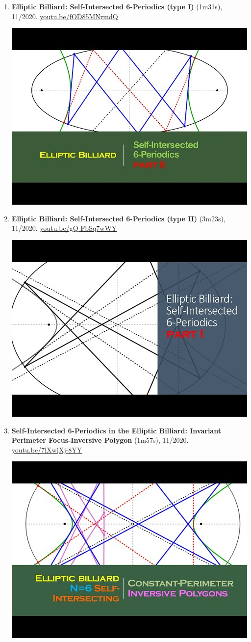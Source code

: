 \documentclass[12pt]{article}
\begin{document}
\begin{enumerate}[resume]
% 
\item \textbf{Elliptic Billiard: Self-Intersected 6-Periodics (type I)} (1m31s), 11/2020. \href{https://youtu.be/fOD85MNrmdQ}{\url{youtu.be/fOD85MNrmdQ}}
\begin{center}\includegraphics[width=.5\textwidth]{pics/fOD85MNrmdQ.jpg}\end{center}
% 
\item \textbf{Elliptic Billiard: Self-Intersected 6-Periodics (type II)} (3m23s), 11/2020. \href{https://youtu.be/gQ-FbSq7wWY}{\url{youtu.be/gQ-FbSq7wWY}}
\begin{center}\includegraphics[width=.5\textwidth]{pics/gQ-FbSq7wWY.jpg}\end{center}
% 
\item \textbf{Self-Intersected 6-Periodics in the Elliptic Billiard: Invariant Perimeter Focus-Inversive Polygon} (1m57s), 11/2020. \href{https://youtu.be/7lXwjXj-8YY}{\url{youtu.be/7lXwjXj-8YY}}
\begin{center}\includegraphics[width=.5\textwidth]{pics/7lXwjXj-8YY.jpg}\end{center}

\end{enumerate}
\end{document}
